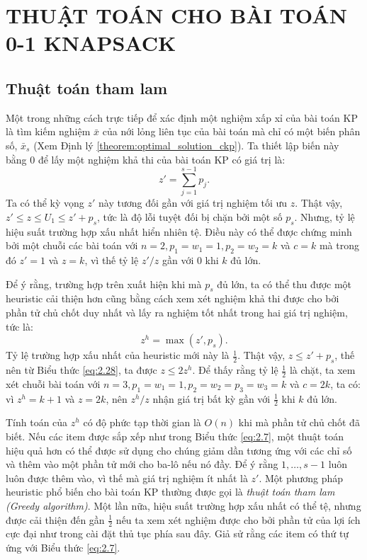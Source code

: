 \chapter{THUẬT TOÁN CHO BÀI TOÁN 0-1 KNAPSACK}


\section{Thuật toán tham lam}

Một trong những cách trực tiếp để xác định một nghiệm xấp xỉ của bài toán KP là tìm kiếm nghiệm $\bar{x}$ của nới lỏng liên tục của bài toán mà chỉ có một biến phân số, $\bar{x}_s$ (Xem Định lý \ref{theorem:optimal_solution_ckp}). Ta thiết lập biến này bằng $0$ để lấy một nghiệm khả thi của bài toán KP có giá trị là:
\begin{equation*}
    z' = \sum_{j=1}^{s - 1}p_j.
\end{equation*}
Ta có thể kỳ vọng $z'$ này tương đối gần với giá trị nghiệm tối ưu $z$. Thật vậy, $z' \leq z \leq U_1 \leq z' + p_s$, tức là độ lỗi tuyệt đối bị chặn bởi một số $p_s$. Nhưng, tỷ lệ hiệu suất trường hợp xấu nhất hiển nhiên tệ. Điều này có thể được chứng minh bởi một chuỗi các bài toán với $n = 2, p_1 = w_1 = 1, p_2 = w_2 = k$ và $c = k$ mà trong đó $z' = 1$ và $z = k$, vì thế tỷ lệ $z'/z$ gần với 0 khi $k$ đủ lớn.

Để ý rằng, trường hợp trên xuất hiện khi mà $p_s$ đủ lớn, ta có thể thu được một heuristic cải thiện hơn cũng bằng cách xem xét nghiệm khả thi được cho bởi phần tử chủ chốt duy nhất và lấy ra nghiệm tốt nhất trong hai giá trị nghiệm, tức là:
\begin{equation}
    \label{eq:2.28}
    z^h = \max(z', p_s).
\end{equation}
Tỷ lệ trường hợp xấu nhất của heuristic mới này là $\frac{1}{2}$. Thật vậy, $z \leq z' + p_s$, thế nên từ Biểu thức \eqref{eq:2.28}, ta được $z \leq 2z^h$. Để thấy rằng tỷ lệ $\frac{1}{2}$ là chặt, ta xem xét chuỗi bài toán với $n = 3, p_1 = w_1 = 1, p_2 = w_2 = p_3 = w_3 = k$ và $c = 2k$, ta có: vì $z^h = k + 1$ và $z=2k$, nên $z^h/z$ nhận giá trị bất kỳ gần với $\frac{1}{2}$ khi $k$ đủ lớn. 

Tính toán của $z^h$ có độ phức tạp thời gian là $O(n)$ khi mà phần tử chủ chốt đã biết. Nếu các item được sắp xếp như trong Biểu thức \eqref{eq:2.7}, một thuật toán hiệu quả hơn có thể được sử dụng cho chúng giảm dần tương ứng với các chỉ số và thêm vào một phần tử mới cho ba-lô nếu nó đầy. Để ý rằng $1,\dots, s - 1$ luôn luôn được thêm vào, vì thế mà giá trị nghiệm ít nhất là $z'$. Một phương pháp heuristic phổ biến cho bài toán KP thường được gọi là \emph{thuật toán tham lam (Greedy algorithm)}. Một lần nữa, hiệu suất trường hợp xấu nhất có thể tệ, nhưng được cải thiện đến gần $\frac{1}{2}$ nếu ta xem xét nghiệm được cho bởi phần tử của lợi ích cực đại như trong cài đặt thủ tục phía sau đây. Giả sử rằng các item có thứ tự ứng với Biểu thức \eqref{eq:2.7}.

